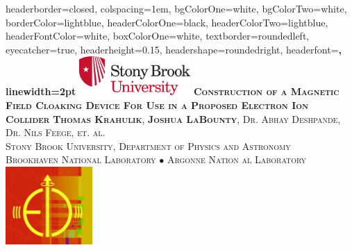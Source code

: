 \documentclass[landscape,a0paper,fontscale=0.290]{baposter} %
\begin{document}
\begin{poster}
{
headerborder=closed, %
colspacing=1em, %
bgColorOne=white, %
bgColorTwo=white, %
borderColor=lightblue, %
headerColorOne=black, %
headerColorTwo=lightblue, %
headerFontColor=white, %
boxColorOne=white, %
textborder=roundedleft, %
eyecatcher=true, %
headerheight=0.15\textheight, %
headershape=roundedright, %
headerfont=\Large\bf\textsc, %
linewidth=2pt %
}
%
{\includegraphics[height=4em]{SB_Logo.png}} %
{\bf\textsc{Construction of a Magnetic Field Cloaking Device For Use in a Proposed Electron Ion Collider}\vspace{0.5em}} %
{\textsc{\textbf{Thomas Krahulik}, \textbf{Joshua LaBounty}, Dr. Abhay Deshpande, Dr. Nils Feege, et. al. \\ Stony Brook University, Department of Physics and Astronomy \\ Brookhaven National Laboratory $\bullet$ Argonne Nation al Laboratory}}%
{\hspace{10mm} \includegraphics[height=8em]{CreatedEICLogo.png}} %


\end{poster}
\end{document}
